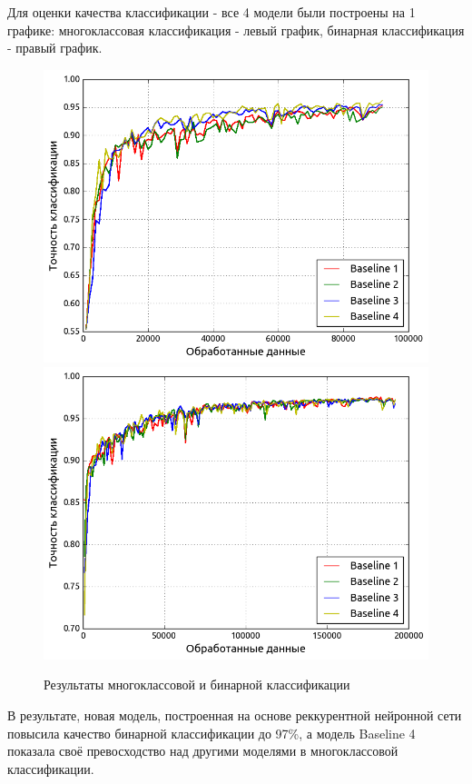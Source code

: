     Для оценки качества классификации - все 4 модели были построены на 1 графике:
    многоклассовая классификация - левый график, бинарная классификация - правый график.
    \begin{figure}[H]
        \left
        \includegraphics[width=0.5\linewidth]{images/lstm_class/all.png}
        \right
        \includegraphics[width=0.5\linewidth]{images/lstm_class/2_class.png}
        \caption{Результаты многоклассовой и бинарной классификации}\label{length_entropy}
    \end{figure}
    В результате, новая модель, построенная на основе реккурентной нейронной сети повысила качество бинарной классификации до 97\%, а модель Baseline 4 показала своё превосходство над другими моделями в многоклассовой классификации.
\clearpage